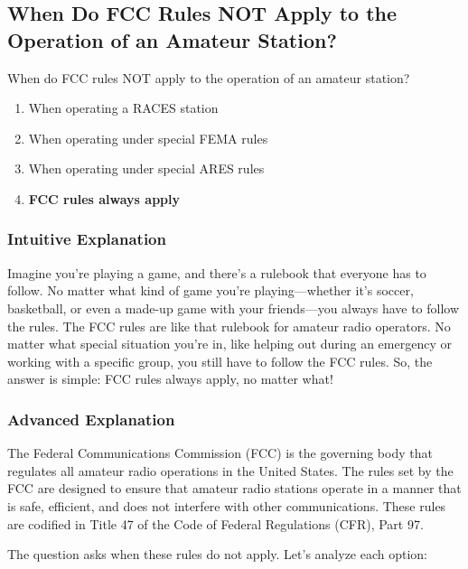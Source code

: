 \subsection{When Do FCC Rules NOT Apply to the Operation of an Amateur Station?}
\label{T2C01}

\begin{tcolorbox}[colback=gray!10!white,colframe=black!75!black,title=T2C01]
When do FCC rules NOT apply to the operation of an amateur station?
\begin{enumerate}[label=\Alph*)]
    \item When operating a RACES station
    \item When operating under special FEMA rules
    \item When operating under special ARES rules
    \item \textbf{FCC rules always apply}
\end{enumerate}
\end{tcolorbox}

\subsubsection{Intuitive Explanation}
Imagine you’re playing a game, and there’s a rulebook that everyone has to follow. No matter what kind of game you’re playing—whether it’s soccer, basketball, or even a made-up game with your friends—you always have to follow the rules. The FCC rules are like that rulebook for amateur radio operators. No matter what special situation you’re in, like helping out during an emergency or working with a specific group, you still have to follow the FCC rules. So, the answer is simple: FCC rules always apply, no matter what!

\subsubsection{Advanced Explanation}
The Federal Communications Commission (FCC) is the governing body that regulates all amateur radio operations in the United States. The rules set by the FCC are designed to ensure that amateur radio stations operate in a manner that is safe, efficient, and does not interfere with other communications. These rules are codified in Title 47 of the Code of Federal Regulations (CFR), Part 97.

The question asks when these rules do not apply. Let's analyze each option:

